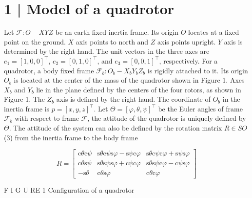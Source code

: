 \documentclass[10pt]{article}
\begin{document}
\section{1 | Model of a quadrotor}
Let $\mathcal{F}: O-X Y Z$ be an earth fixed inertia frame. Its origin $O$ locates at a fixed point on the ground. $X$ axis points to north and $Z$ axis points upright. $Y$ axis is determined by the right hand. The unit vectors in the three axes are $e_{1}=[1,0,0]^{\top}$, $e_{2}=[0,1,0]^{\top}$, and $e_{3}=[0,0,1]^{\top}$, respectively. For a quadrotor, a body fixed frame $\mathcal{F}_{b}: O_{b}-X_{b} Y_{b} Z_{b}$ is rigidly attached to it. Its origin $O_{b}$ is located at the center of the mass of the quadrotor shown in Figure 1. Axes $X_{b}$ and $Y_{b}$ lie in the plane defined by the centers of the four rotors, as shown in Figure 1. The $Z_{b}$ axis is defined by the right hand. The coordinate of $O_{b}$ in the inertia frame is $p=[x, y, z]^{\top}$. Let $\Theta=[\varphi, \theta, \psi]^{\top}$ be the Euler angles of frame $\mathcal{F}_{b}$ with respect to frame $\mathcal{F}$, the attitude of the quadrotor is uniquely defined by $\Theta$. The attitude of the system can also be defined by the rotation matrix $R \in S O$ (3) from the inertia frame to the body frame

$$
R=\left[\begin{array}{ccc}
\mathrm{c} \theta \mathrm{c} \psi & \mathrm{s} \theta \mathrm{c} \psi \mathrm{s} \varphi-\mathrm{s} \psi \mathrm{c} \varphi & \mathrm{s} \theta \mathrm{c} \psi \mathrm{c} \varphi+\mathrm{s} \psi \mathrm{s} \varphi \\
\mathrm{c} \theta \mathrm{s} \psi & \mathrm{s} \theta \mathrm{s} \psi \mathrm{s} \varphi+\mathrm{c} \psi \mathrm{c} \varphi & \mathrm{s} \theta \mathrm{s} \psi \mathrm{c} \varphi-\mathrm{c} \psi \mathrm{s} \varphi \\
-\mathrm{s} \theta & \mathrm{c} \theta \mathrm{s} \varphi & \mathrm{c} \theta \mathrm{c} \varphi
\end{array}\right]
$$

F I G U RE 1 Configuration of a quadrotor
\end{document}
